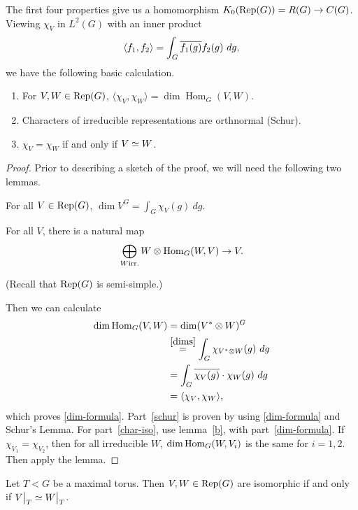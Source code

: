 The first four properties give us a homomorphism
$K_0(\mathrm{Rep}(G)) = R(G) \rightarrow C(G)$. Viewing $\chi_V$ in $L^2(G)$ with an
inner product
\[ \langle f_1, f_2 \rangle = \int_G \overline{f_1(g)} f_2(g) \ dg, \]
we have the following basic calculation.

\begin{prop}
\begin{enumerate}[(1)]
\item\label{dim-formula} For $V, W \in \mathrm{Rep}(G)$,
$\langle \chi_V, \chi_W \rangle = \dim \operatorname{Hom}_G (V, W).$
\item\label{schur} Characters of irreducible representations are orthnormal 
(Schur).
\item\label{char-iso}$\chi_V = \chi_W$ if and only if $V \simeq W$.
\end{enumerate}
\end{prop}

\begin{proof}
Prior to describing a sketch of the proof, we will need the following two
lemmas.

\begin{lem}\label{dims}
For all $V \in \mathrm{Rep}(G)$, $\dim V^G = \displaystyle\int_G \chi_V(g) \ dg$.
\end{lem}

\begin{lem}\label{b}
For all $V$, there is a natural map
\[ \bigoplus_{W \mathrm{irr.}} W \otimes \operatorname{Hom}_G(W, V) \rightarrow V. \]
\end{lem}

(Recall that $\mathrm{Rep}(G)$ is semi-simple.)

Then we can calculate
\begin{align*}
\dim \operatorname{Hom}_G(V, W) & = \dim (V^* \otimes W)^G \\
& \stackrel{\ref{dims}}{=} \int_G \chi_{V^* \otimes W} (g) \ dg\\
& = \int_G \overline{\chi_V(g)} \cdot \chi_W(g) \ dg \\
& = \langle \chi_V, \chi_W \rangle,
\end{align*}
which proves \ref{dim-formula}. Part~\ref{schur} is proven by using
\ref{dim-formula} and Schur's Lemma. For part~\ref{char-iso}, use lemma~\ref{b},
with part~\ref{dim-formula}. If $\chi_{V_1} = \chi_{V_2}$, then for all
irreducible $W$, $\dim \operatorname{Hom}_G(W, V_i)$ is the same for $i = 1, 2$. Then 
apply the lemma.
\end{proof}

\begin{prop}\label{motto-justification}
Let $T < G$ be a maximal torus. Then $V, W \in \mathrm{Rep}(G)$ are isomorphic if and
only if $\restr{V}{T} \iso \restr{W}{T}$.
\end{prop}

